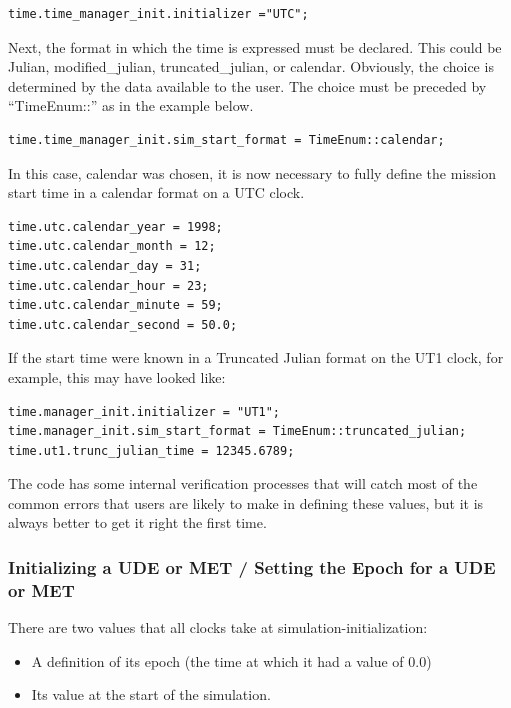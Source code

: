\begin{verbatim}
time.time_manager_init.initializer ="UTC";
\end{verbatim}




Next, the format in which the time is expressed must be declared.  This
could be Julian, modified\_julian, truncated\_julian, or calendar.
Obviously, the choice is determined by the data available to the user.
The choice must be preceded by
{\textquotedblleft}TimeEnum::{\textquotedblright} as in the example
below.


\begin{verbatim}
time.time_manager_init.sim_start_format = TimeEnum::calendar;
\end{verbatim}

In this case, calendar was chosen, it is now necessary to fully define
the mission start time in a calendar format on a UTC clock.

\begin{verbatim}
time.utc.calendar_year = 1998;
time.utc.calendar_month = 12;
time.utc.calendar_day = 31;
time.utc.calendar_hour = 23;
time.utc.calendar_minute = 59;
time.utc.calendar_second = 50.0;
\end{verbatim}

If the start time were known in a Truncated Julian format on the UT1
clock, for example, this may have looked like:

\begin{verbatim}
time.manager_init.initializer = "UT1";
time.manager_init.sim_start_format = TimeEnum::truncated_julian;
time.ut1.trunc_julian_time = 12345.6789;
\end{verbatim}

The code has some internal verification processes that will catch most
of the common errors that users are likely to make in defining these values,
but it is always
better to get it right the first time.



\subsubsection {Initializing a UDE or MET / Setting the Epoch for a UDE or
MET}

There are two values that all clocks take at simulation-initialization:
\begin{itemize}
\item A definition of its epoch (the time at which it had a value of 0.0)
\item Its value at the start of the simulation.
\end{itemize}

